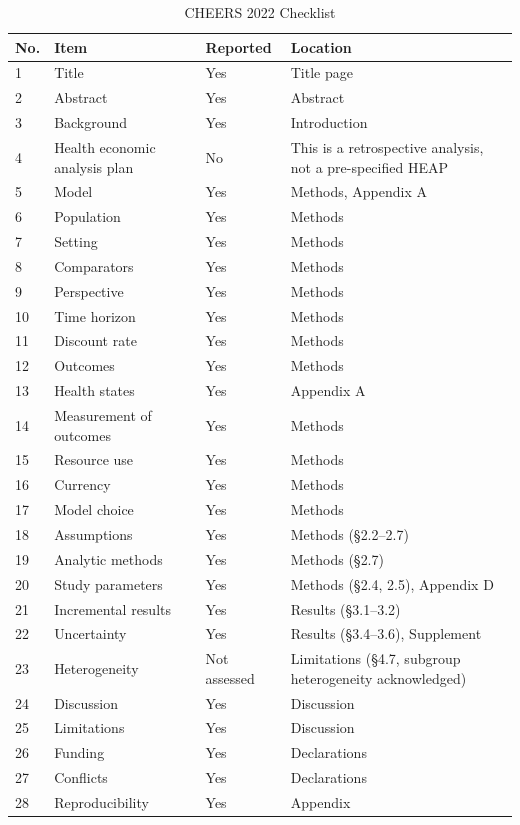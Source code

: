 \documentclass[11pt,a4paper]{article}
\begin{document}
\begin{table}[H]
\centering
\caption{CHEERS 2022 Checklist}
\label{tab:cheers}
\begin{tabularx}{\linewidth}{@{}p{0.7cm}X p{1.6cm}X@{}}
\toprule
\textbf{No.} & \textbf{Item} & {\scriptsize\textbf{Reported}} & \textbf{Location} \\
\midrule
1 & Title & Yes & Title page \\
2 & Abstract & Yes & Abstract \\
3 & Background & Yes & Introduction \\
4 & Health economic analysis plan & No & This is a retrospective analysis, not a pre-specified HEAP \\
5 & Model & Yes & Methods, Appendix A \\
6 & Population & Yes & Methods \\
7 & Setting & Yes & Methods \\
8 & Comparators & Yes & Methods \\
9 & Perspective & Yes & Methods \\
10 & Time horizon & Yes & Methods \\
11 & Discount rate & Yes & Methods \\
12 & Outcomes & Yes & Methods \\
13 & Health states & Yes & Appendix A \\
14 & Measurement of outcomes & Yes & Methods \\
15 & Resource use & Yes & Methods \\
16 & Currency & Yes & Methods \\
17 & Model choice & Yes & Methods \\
18 & Assumptions & Yes & Methods ({\S}2.2--2.7) \\
19 & Analytic methods & Yes & Methods ({\S}2.7) \\
20 & Study parameters & Yes & Methods ({\S}2.4, 2.5), Appendix D \\
21 & Incremental results & Yes & Results ({\S}3.1--3.2) \\
22 & Uncertainty & Yes & Results ({\S}3.4--3.6), Supplement \\
23 & Heterogeneity & Not assessed & Limitations ({\S}4.7, subgroup heterogeneity acknowledged) \\
24 & Discussion & Yes & Discussion \\
25 & Limitations & Yes & Discussion \\
26 & Funding & Yes & Declarations \\
27 & Conflicts & Yes & Declarations \\
28 & Reproducibility & Yes & Appendix \\
\bottomrule
\end{tabularx}
\end{table}

\newpage

\end{document}
